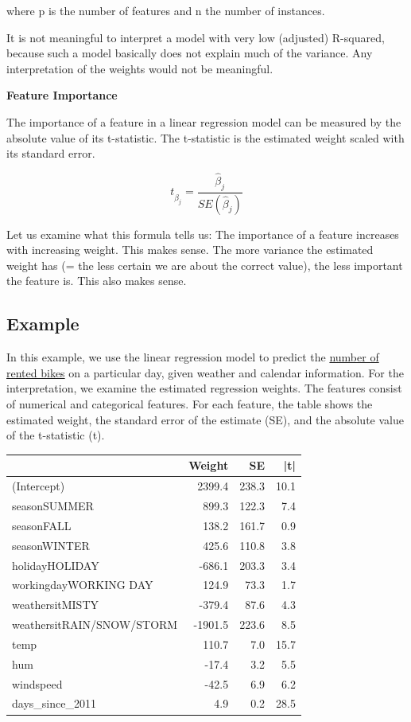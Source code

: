 \documentclass[12pt,]{krantz}
\begin{document}
where p is the number of features and n the number of instances.

It is not meaningful to interpret a model with very low (adjusted)
R-squared, because such a model basically does not explain much of the
variance. Any interpretation of the weights would not be meaningful.

\textbf{Feature Importance}

The importance of a feature in a linear regression model can be measured
by the absolute value of its t-statistic. The t-statistic is the
estimated weight scaled with its standard error.

\[t_{\hat{\beta}_j}=\frac{\hat{\beta}_j}{SE(\hat{\beta}_j)}\]

Let us examine what this formula tells us: The importance of a feature
increases with increasing weight. This makes sense. The more variance
the estimated weight has (= the less certain we are about the correct
value), the less important the feature is. This also makes sense.

\subsection{Example}\label{example}

In this example, we use the linear regression model to predict the
\protect\hyperlink{bike-data}{number of rented bikes} on a particular
day, given weather and calendar information. For the interpretation, we
examine the estimated regression weights. The features consist of
numerical and categorical features. For each feature, the table shows
the estimated weight, the standard error of the estimate (SE), and the
absolute value of the t-statistic (\textbar{}t\textbar{}).

\begin{tabular}{l|r|r|r}
\hline
  & Weight & SE & |t|\\
\hline
(Intercept) & 2399.4 & 238.3 & 10.1\\
\hline
seasonSUMMER & 899.3 & 122.3 & 7.4\\
\hline
seasonFALL & 138.2 & 161.7 & 0.9\\
\hline
seasonWINTER & 425.6 & 110.8 & 3.8\\
\hline
holidayHOLIDAY & -686.1 & 203.3 & 3.4\\
\hline
workingdayWORKING DAY & 124.9 & 73.3 & 1.7\\
\hline
weathersitMISTY & -379.4 & 87.6 & 4.3\\
\hline
weathersitRAIN/SNOW/STORM & -1901.5 & 223.6 & 8.5\\
\hline
temp & 110.7 & 7.0 & 15.7\\
\hline
hum & -17.4 & 3.2 & 5.5\\
\hline
windspeed & -42.5 & 6.9 & 6.2\\
\hline
days\_since\_2011 & 4.9 & 0.2 & 28.5\\
\hline
\end{tabular}
\end{document}
